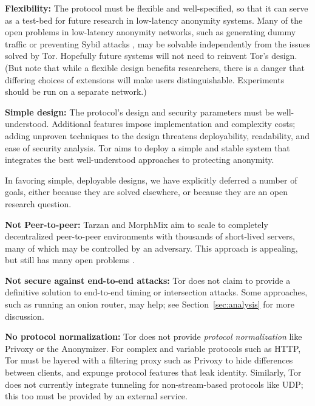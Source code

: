 \documentclass[times,10pt,twocolumn]{article}
\begin{document}
\textbf{Flexibility:} The protocol must be flexible and well-specified,
so that it can serve as a test-bed for future research in low-latency
anonymity systems.  Many of the open problems in low-latency anonymity
networks, such as generating dummy traffic or preventing Sybil attacks
\cite{sybil}, may be solvable independently from the issues solved by
Tor. Hopefully future systems will not need to reinvent Tor's design.
(But note that while a flexible design benefits researchers,
there is a danger that differing choices of extensions will make users
distinguishable. Experiments should be run on a separate network.)

\textbf{Simple design:} The protocol's design and security
parameters must be well-understood. Additional features impose implementation
and complexity costs; adding unproven techniques to the design threatens
deployability, readability, and ease of security analysis. Tor aims to
deploy a simple and stable system that integrates the best well-understood
approaches to protecting anonymity.

\label{subsec:non-goals}
In favoring simple, deployable designs, we have explicitly deferred
a number of goals, either because they are solved elsewhere, or because
they are an open research question.

\textbf{Not Peer-to-peer:} Tarzan and MorphMix aim to scale to completely
decentralized peer-to-peer environments with thousands of short-lived
servers, many of which may be controlled by an adversary.  This approach
is appealing, but still has many open problems
\cite{tarzan:ccs02,morphmix:fc04}.

\textbf{Not secure against end-to-end attacks:} Tor does not claim
to provide a definitive solution to end-to-end timing or intersection
attacks. Some approaches, such as running an onion router, may help;
see Section~\ref{sec:analysis} for more discussion.

\textbf{No protocol normalization:} Tor does not provide \emph{protocol
normalization} like Privoxy or the Anonymizer. For complex and variable
protocols such as HTTP, Tor must be layered with a filtering proxy such
as Privoxy to hide differences between clients, and expunge protocol
features that leak identity. Similarly, Tor does not currently integrate
tunneling for non-stream-based protocols like UDP; this too must be
provided by an external service.
\end{document}
